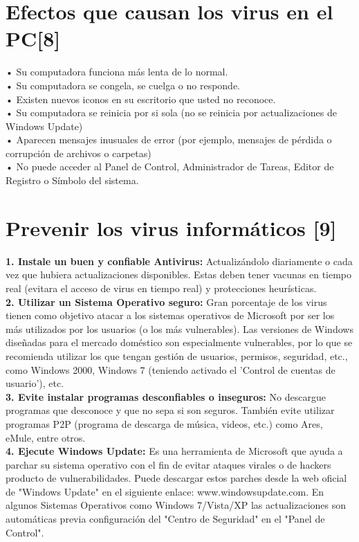 \documentclass[12pt,a4paper]{article}
\begin{document}
	\section{Efectos que causan los virus en el PC[8]}
	
	•	Su computadora funciona más lenta de lo normal.\\
	•	Su computadora se congela, se cuelga o no responde.\\
	•	Existen nuevos iconos en su escritorio que usted no reconoce.\\
	•	Su computadora se reinicia por si sola (no se reinicia por actualizaciones de Windows Update)\\
	•	Aparecen mensajes inusuales de error (por ejemplo, mensajes de pérdida o corrupción de archivos o carpetas)\\
	•	No puede acceder al Panel de Control, Administrador de Tareas, Editor de Registro o Símbolo del sistema.
	
	\section{Prevenir los virus informáticos [9]}
	
	\textbf{1. Instale un buen y confiable Antivirus:} Actualizándolo diariamente o cada vez que hubiera actualizaciones disponibles. Estas deben tener vacunas en tiempo real (evitara el acceso de virus en tiempo real) y protecciones heurísticas.\\
	
	\textbf{2. Utilizar un Sistema Operativo seguro:} Gran porcentaje de los virus tienen como objetivo atacar a los sistemas operativos de Microsoft por ser los más utilizados por los usuarios (o los más vulnerables). Las versiones de Windows diseñadas para el mercado doméstico son especialmente vulnerables, por lo que se recomienda utilizar los que tengan gestión de usuarios, permisos, seguridad, etc., como Windows 2000, Windows 7 (teniendo activado el 'Control de cuentas de usuario'), etc.\\
	
	\textbf{3. Evite instalar programas desconfiables o inseguros:} No descargue programas que desconoce y que no sepa si son seguros. También evite utilizar programas P2P (programa de descarga de música, videos, etc.) como Ares, eMule, entre otros.\\
	
	\textbf{4. Ejecute Windows Update:} Es una herramienta de Microsoft que ayuda a parchar su sistema operativo con el fin de evitar ataques virales o de hackers producto de vulnerabilidades. Puede descargar estos parches desde la web oficial de "Windows Update" en el siguiente enlace: www.windowsupdate.com. En algunos Sistemas Operativos como Windows 7/Vista/XP las actualizaciones son automáticas previa configuración del "Centro de Seguridad" en el "Panel de Control".\\
	
\end{document}
